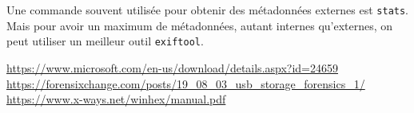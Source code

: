 \documentclass[a4paper]{article}
\begin{document}
Une commande souvent utilisée pour obtenir des métadonnées externes est \texttt{\small stats}. Mais pour avoir un maximum de métadonnées, autant internes qu'externes, on peut utiliser un meilleur outil \texttt{\small exiftool}.




















\newpage \tableofcontents \listoffigures \listoflistings
\begin{thebibliography}{9}
 {\small \url{https://www.microsoft.com/en-us/download/details.aspx?id=24659}}
 {\small \url{https://forensixchange.com/posts/19\_08\_03\_usb\_storage\_forensics\_1/}}
 {\small \url{https://www.x-ways.net/winhex/manual.pdf}}
\end{thebibliography}
\end{document}
